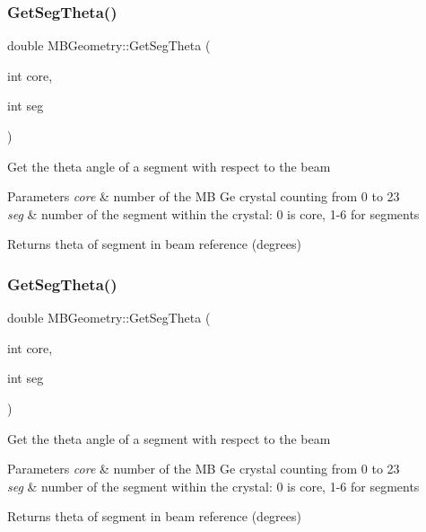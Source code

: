 \subsubsection{\texorpdfstring{Get\+Seg\+Theta()}{GetSegTheta()}\hspace{0.1cm}{\footnotesize\ttfamily [1/2]}}
{\footnotesize\ttfamily double M\+B\+Geometry\+::\+Get\+Seg\+Theta (\begin{DoxyParamCaption}\item[{int}]{core,  }\item[{int}]{seg }\end{DoxyParamCaption})}

Get the theta angle of a segment with respect to the beam 
\begin{DoxyParams}{Parameters}
{\em core} & number of the MB Ge crystal counting from 0 to 23 \\
\hline
{\em seg} & number of the segment within the crystal\+: 0 is core, 1-\/6 for segments \\
\hline
\end{DoxyParams}
\begin{DoxyReturn}{Returns}
theta of segment in beam reference (degrees) 
\end{DoxyReturn}
\mbox{\label{class_m_b_geometry_a49cdf742a2902fc85f0b24dfffa554a8}} 
\subsubsection{\texorpdfstring{Get\+Seg\+Theta()}{GetSegTheta()}\hspace{0.1cm}{\footnotesize\ttfamily [2/2]}}
{\footnotesize\ttfamily double M\+B\+Geometry\+::\+Get\+Seg\+Theta (\begin{DoxyParamCaption}\item[{int}]{core,  }\item[{int}]{seg }\end{DoxyParamCaption})}

Get the theta angle of a segment with respect to the beam 
\begin{DoxyParams}{Parameters}
{\em core} & number of the MB Ge crystal counting from 0 to 23 \\
\hline
{\em seg} & number of the segment within the crystal\+: 0 is core, 1-\/6 for segments \\
\hline
\end{DoxyParams}
\begin{DoxyReturn}{Returns}
theta of segment in beam reference (degrees) 
\end{DoxyReturn}
\mbox{\label{class_m_b_geometry_a399568d67bb83801ef6a2dbe963a535e}} 
